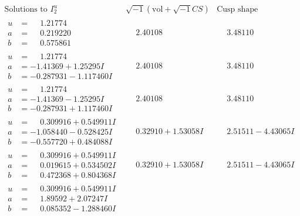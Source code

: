 \documentclass[1p]{elsarticle_modified}
\theoremstyle{definition}
\newcommand{\I}{\sqrt{-1}}
\begin{document}
$$\begin{array}{c|c|c}  
\text{Solutions to }I^u_{2}& \I (\text{vol} + \sqrt{-1}CS) & \text{Cusp shape}\\
 \hline 
\begin{aligned}
u &= \phantom{-}1.21774\phantom{ +0.000000I} \\
a &= \phantom{-}0.219220\phantom{ +0.000000I} \\
b &= \phantom{-}0.575861\phantom{ +0.000000I}\end{aligned}
 & \phantom{-}2.40108\phantom{ +0.000000I} & \phantom{-}3.48110\phantom{ +0.000000I} \\ \hline\begin{aligned}
u &= \phantom{-}1.21774\phantom{ +0.000000I} \\
a &= -1.41369 + 1.25295 I \\
b &= -0.287931 - 1.117460 I\end{aligned}
 & \phantom{-}2.40108\phantom{ +0.000000I} & \phantom{-}3.48110\phantom{ +0.000000I} \\ \hline\begin{aligned}
u &= \phantom{-}1.21774\phantom{ +0.000000I} \\
a &= -1.41369 - 1.25295 I \\
b &= -0.287931 + 1.117460 I\end{aligned}
 & \phantom{-}2.40108\phantom{ +0.000000I} & \phantom{-}3.48110\phantom{ +0.000000I} \\ \hline\begin{aligned}
u &= \phantom{-}0.309916 + 0.549911 I \\
a &= -1.058440 - 0.528425 I \\
b &= -0.557720 + 0.484088 I\end{aligned}
 & \phantom{-}0.32910 + 1.53058 I & \phantom{-}2.51511 - 4.43065 I \\ \hline\begin{aligned}
u &= \phantom{-}0.309916 + 0.549911 I \\
a &= \phantom{-}0.019615 + 0.534502 I \\
b &= \phantom{-}0.472368 + 0.804368 I\end{aligned}
 & \phantom{-}0.32910 + 1.53058 I & \phantom{-}2.51511 - 4.43065 I \\ \hline\begin{aligned}
u &= \phantom{-}0.309916 + 0.549911 I \\
a &= \phantom{-}1.89592 + 2.07247 I \\
b &= \phantom{-}0.085352 - 1.288460 I\end{aligned}

\end{array}$$
\end{document}
